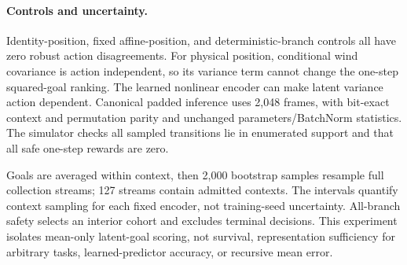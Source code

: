 \paragraph{Controls and uncertainty.}
Identity-position, fixed affine-position, and deterministic-branch controls all have zero robust
action disagreements. For physical position, conditional wind covariance is action independent,
so its variance term cannot change the one-step squared-goal ranking. The learned nonlinear encoder
can make latent variance action dependent. Canonical padded inference uses 2,048 frames, with
bit-exact context and permutation parity and unchanged parameters/BatchNorm statistics. The simulator
checks all sampled transitions lie in enumerated support and that all safe one-step rewards are zero.

Goals are averaged within context, then 2,000 bootstrap samples resample full collection streams;
127 streams contain admitted contexts. The intervals quantify context sampling for each fixed
encoder, not training-seed uncertainty. All-branch safety selects an interior cohort and excludes
terminal decisions. This experiment isolates mean-only latent-goal scoring, not survival,
representation sufficiency for arbitrary tasks, learned-predictor accuracy, or recursive mean error.
